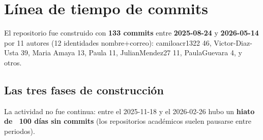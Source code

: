 \section{Línea de tiempo de commits}

El repositorio fue construido con \textbf{133 commits} entre
\textbf{2025-08-24} y \textbf{2026-05-14} por 11
autores (12 identidades nombre+correo): camiloacr1322 46, Victor-Diaz-Usta 39,
Maria Amaya 13, Paula 11, JulianMendez27 11, PaulaGuevara 4, y otros.

\subsection{Las tres fases de construcción}

La actividad no fue continua: entre el 2025-11-18 y el 2026-02-26 hubo un
\textbf{hiato de ~100 días sin commits} (los repositorios académicos suelen
pausarse entre periodos).

